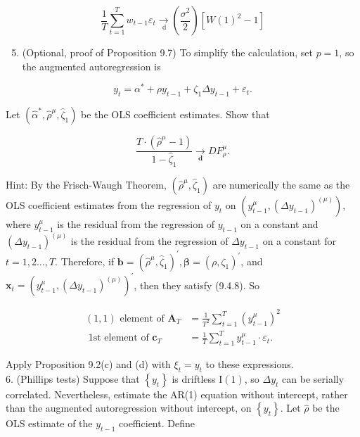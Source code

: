 \documentclass[10pt]{article}
\begin{document}
$$
\frac{1}{T} \sum_{t=1}^{T} w_{t-1} \varepsilon_{t} \underset{\mathrm{~d}}{\rightarrow}\left(\frac{\sigma^{2}}{2}\right)\left[W(1)^{2}-1\right]
$$

\begin{enumerate}
  \setcounter{enumi}{4}
  \item (Optional, proof of Proposition 9.7) To simplify the calculation, set $p=1$, so the augmented autoregression is
\end{enumerate}

$$
y_{t}=\alpha^{*}+\rho y_{t-1}+\zeta_{1} \Delta y_{t-1}+\varepsilon_{t} .
$$

Let $\left(\hat{\alpha}^{*}, \hat{\rho}^{\mu}, \hat{\zeta}_{1}\right)$ be the OLS coefficient estimates. Show that

$$
\frac{T \cdot\left(\hat{\rho}^{\mu}-1\right)}{1-\hat{\zeta}_{1}} \underset{\mathbf{d}}{\rightarrow} D F_{\rho}^{\mu} .
$$

Hint: By the Frisch-Waugh Theorem, $\left(\hat{\rho}^{\mu}, \hat{\zeta}_{1}\right)$ are numerically the same as the OLS coefficient estimates from the regression of $y_{t}$ on $\left(y_{t-1}^{\mu},\left(\Delta y_{t-1}\right)^{(\mu)}\right)$, where $y_{t-1}^{\mu}$ is the residual from the regression of $y_{t-1}$ on a constant and $\left(\Delta y_{t-1}\right)^{(\mu)}$ is the residual from the regression of $\Delta y_{t-1}$ on a constant for $t=1,2 \ldots, T$. Therefore, if $\mathbf{b}=\left(\hat{\rho}^{\mu}, \hat{\zeta}_{1}\right)^{\prime}, \boldsymbol{\beta}=\left(\rho, \zeta_{1}\right)^{\prime}$, and $\mathbf{x}_{t}=\left(y_{t-1}^{\mu},\left(\Delta y_{t-1}\right)^{(\mu)}\right)^{\prime}$, then they satisfy (9.4.8). So

$$
\begin{aligned}
(1,1) \text { element of } \mathbf{A}_{T} & =\frac{1}{T^{2}} \sum_{t=1}^{T}\left(y_{t-1}^{\mu}\right)^{2} \\
\text { 1st element of } \mathbf{c}_{T} & =\frac{1}{T} \sum_{t=1}^{T} y_{t-1}^{\mu} \cdot \varepsilon_{t} .
\end{aligned}
$$

Apply Proposition 9.2(c) and (d) with $\xi_{t}=y_{t}$ to these expressions.\\
6. (Phillips tests) Suppose that $\left\{y_{t}\right\}$ is driftless $\mathrm{I}(1)$, so $\Delta y_{t}$ can be serially correlated. Nevertheless, estimate the AR(1) equation without intercept, rather than the augmented autoregression without intercept, on $\left\{y_{t}\right\}$. Let $\hat{\rho}$ be the OLS estimate of the $y_{t-1}$ coefficient. Define
\end{document}
